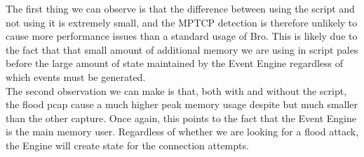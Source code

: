 The first thing we can observe is that the difference between using the script and not using it is extremely small, and the MPTCP detection is therefore unlikely to cause more performance issues than a standard usage of Bro. This is likely due to the fact that that small amount of additional memory we are using in script pales before the large amount of state maintained by the Event Engine regardless of which events must be generated. \\

The second observation we can make is that, both with and without the script, the flood pcap cause a much higher peak memory usage despite but much smaller than the other capture. Once again, this points to the fact that the Event Engine is the main memory user. Regardless of whether we are looking for a flood attack, the Engine will create state for the connection attempts.